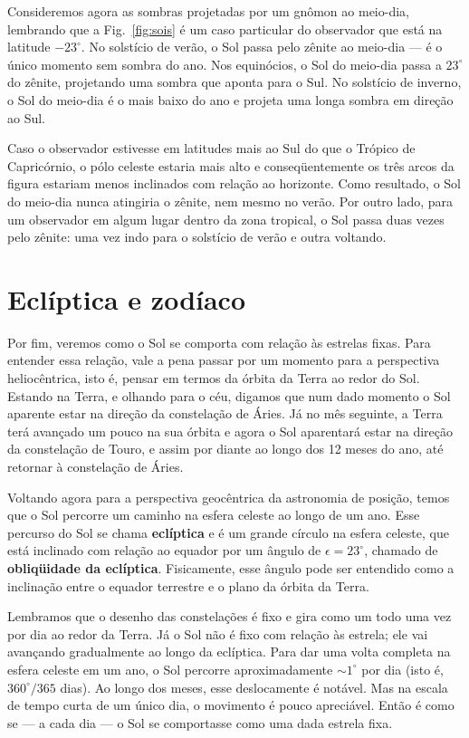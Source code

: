 Consideremos agora as sombras projetadas por um gnômon ao meio-dia, lembrando que a Fig.~\ref{fig:sois} é um caso particular do observador que está na latitude $-23^{\circ}$. No solstício de verão, o Sol passa pelo zênite ao meio-dia --- é o único momento sem sombra do ano. Nos equinócios, o Sol do meio-dia passa a $23^{\circ}$ do zênite, projetando uma sombra que aponta para o Sul. No solstício de inverno, o Sol do meio-dia é o mais baixo do ano e projeta uma longa sombra em direção ao Sul.

Caso o observador estivesse em latitudes mais ao Sul do que o Trópico de Capricórnio, o pólo celeste estaria mais alto e conseqüentemente os três arcos da figura estariam menos inclinados com relação ao horizonte. Como resultado, o Sol do meio-dia nunca atingiria o zênite, nem mesmo no verão. Por outro lado, para um observador em algum lugar dentro da zona tropical, o Sol passa duas vezes pelo zênite: uma vez indo para o solstício de verão e outra voltando.

\section{Eclíptica e zodíaco}

Por fim, veremos como o Sol se comporta com relação às estrelas fixas. Para entender essa relação, vale a pena passar por um momento para a perspectiva heliocêntrica, isto é, pensar em termos da órbita da Terra ao redor do Sol. Estando na Terra, e olhando para o céu, digamos que num dado momento o Sol aparente estar na direção da constelação de Áries. Já no mês seguinte, a Terra terá avançado um pouco na sua órbita e agora o Sol aparentará estar na direção da constelação de Touro, e assim por diante ao longo dos 12 meses do ano, até retornar à constelação de Áries.

Voltando agora para a perspectiva geocêntrica da astronomia de posição, temos que o Sol percorre um caminho na esfera celeste ao longo de um ano. Esse percurso do Sol se chama \textbf{eclíptica} e é um grande círculo na esfera celeste, que está inclinado com relação ao equador por um ângulo de $\epsilon = 23^{\circ}$, chamado de \textbf{obliqüidade da eclíptica}. Fisicamente, esse ângulo pode ser entendido como a inclinação entre o equador terrestre e o plano da órbita da Terra. 

Lembramos que o desenho das constelações é fixo e gira como um todo uma vez por dia ao redor da Terra. Já o Sol não é fixo com relação às estrela; ele vai avançando gradualmente ao longo da eclíptica. Para dar uma volta completa na esfera celeste em um ano, o Sol percorre aproximadamente ${\sim}1^{\circ}$ por dia (isto é, $360^{\circ} / 365$ dias). Ao longo dos meses, esse deslocamente é notável. Mas na escala de tempo curta de um único dia, o movimento é pouco apreciável. Então é como se --- a cada dia --- o Sol se comportasse como uma dada estrela fixa.

